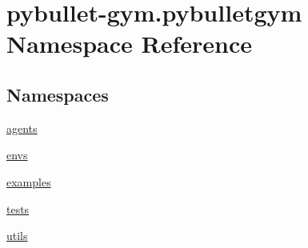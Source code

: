 \hypertarget{namespacepybullet-gym_1_1pybulletgym}{}\section{pybullet-\/gym.pybulletgym Namespace Reference}
\label{namespacepybullet-gym_1_1pybulletgym}
\subsection*{Namespaces}
\begin{DoxyCompactItemize}
\item 
 \hyperlink{namespacepybullet-gym_1_1pybulletgym_1_1agents}{agents}
\item 
 \hyperlink{namespacepybullet-gym_1_1pybulletgym_1_1envs}{envs}
\item 
 \hyperlink{namespacepybullet-gym_1_1pybulletgym_1_1examples}{examples}
\item 
 \hyperlink{namespacepybullet-gym_1_1pybulletgym_1_1tests}{tests}
\item 
 \hyperlink{namespacepybullet-gym_1_1pybulletgym_1_1utils}{utils}
\end{DoxyCompactItemize}
